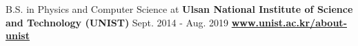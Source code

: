 \large
{}

\cveventeducation
{B.S. in Physics and Computer Science at }
{\textbf{Ulsan National Institute of Science and Technology (UNIST)}}
{Sept. 2014 - Aug. 2019}
{
    \href{https://www.unist.ac.kr/about-unist/}{\textbf{www.unist.ac.kr/about-unist}}
}
